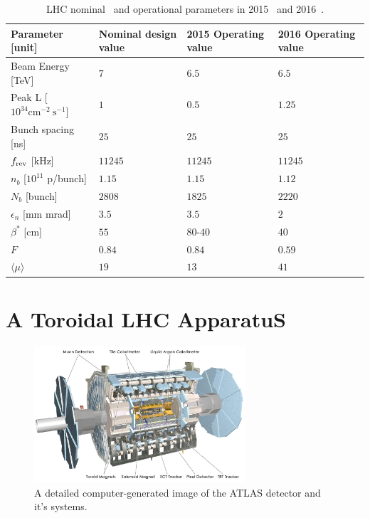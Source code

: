 \begin{table}[]
\centering
\begin{tabular*}{\textwidth}{@{\extracolsep{\fill}}llll}
\hline
Parameter [unit]   & Nominal design value & 2015 Operating value  & 2016 Operating value\\
\hline\hline
Beam Energy [TeV]  & $7$  & $6.5$  & $6.5$  \\
Peak L [$10^{34} \text{cm}^{−2}~\text{s}^{-1}$]   & $1$ &   $0.5$  & $1.25$           \\
Bunch spacing [ns]             &      $25$  &  $25$ &      $25$ \\
$f_{\rm rev}$ [kHz]    &     $11245$  & $11245$  & $11245$ \\
$n_b$  [$10^{11}$ p/bunch]   & $1.15$ &  $1.15$ & $1.12$\\
$N_b$  [bunch]         & $2808$   &      $1825$ &      $2220$\\
$\epsilon_n$  [mm mrad]        & $3.5$ &  $3.5$  & $2$\\
$\beta^*$   [cm]         & $55$  &   $80$-$40$  & $40$\\
$F$        &      $0.84$  & $0.84$  &  $0.59$ \\
$\langle \mu \rangle$ & $19$ & $13$ & $41$ \\ \hline
\hline            
\end{tabular*}
\caption[LHC nominal and operational parameters]{LHC nominal~\cite{LHCPaper} and operational parameters in 2015~\cite{LHC_2015} and 2016~\cite{LHC_2016}.}
\label{Ch2:tab-lhc}
\end{table}


\section{A Toroidal LHC ApparatuS}
\label{sec:ATLAS}

\begin{figure}[h!]
  \centering
  \captionsetup{justification=centering}
  \includegraphics[width=0.7\textwidth]{figures/detector/ATLAS.jpg}
   \caption{A detailed computer-generated image of the ATLAS detector and it's systems.}
  \label{fig:ATLAS}
\end{figure}

